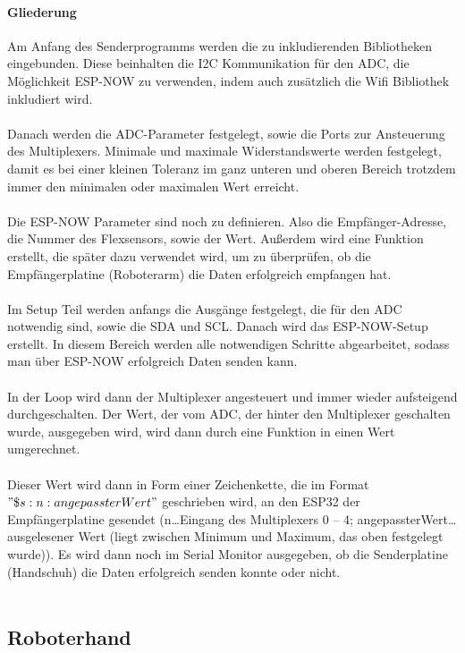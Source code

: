 \documentclass[titlepage,12pt,twoside]{article}
\begin{document}
\paragraph{Gliederung}
\hfill \break
\hfill \break
Am Anfang des Senderprogramms werden die zu inkludierenden Bibliotheken eingebunden. Diese beinhalten die I2C Kommunikation für 
den ADC, die Möglichkeit ESP-NOW zu verwenden, indem auch zusätzlich die Wifi Bibliothek inkludiert wird. \\
\\
Danach werden die ADC-Parameter festgelegt, sowie die Ports zur Ansteuerung des Multiplexers. Minimale und maximale 
Widerstandswerte werden festgelegt, damit es bei einer kleinen Toleranz im ganz unteren und oberen Bereich trotzdem immer den 
minimalen oder maximalen Wert erreicht. \\
\\
Die ESP-NOW Parameter sind noch zu definieren. Also die Empfänger-Adresse, die Nummer des Flexsensors, sowie der Wert. Außerdem 
wird eine Funktion erstellt, die später dazu verwendet wird, um zu überprüfen, ob die Empfängerplatine (Roboterarm) die Daten 
erfolgreich empfangen hat. \\
\\
Im Setup Teil werden anfangs die Ausgänge festgelegt, die für den ADC notwendig sind, sowie die SDA und SCL. Danach wird das 
ESP-NOW-Setup erstellt. In diesem Bereich werden alle notwendigen Schritte abgearbeitet, sodass man über ESP-NOW erfolgreich 
Daten senden kann. \\
\\
In der Loop wird dann der Multiplexer angesteuert und immer wieder aufsteigend durchgeschalten. Der Wert, der vom ADC, der
hinter den Multiplexer geschalten wurde, ausgegeben wird, wird dann durch eine Funktion in einen Wert umgerechnet. \\
\\
Dieser Wert wird dann in Form einer Zeichenkette, die im Format $"\$s:n:angepassterWert"$ geschrieben wird, an den ESP32 der 
Empfängerplatine gesendet (n…Eingang des Multiplexers 0 – 4; angepassterWert…ausgelesener Wert (liegt zwischen Minimum und 
Maximum, das oben festgelegt wurde)). Es wird dann noch im Serial Monitor ausgegeben, ob die Senderplatine (Handschuh) die 
Daten erfolgreich senden konnte oder nicht. \\
\\

\subsection{Roboterhand}
\end{document}
